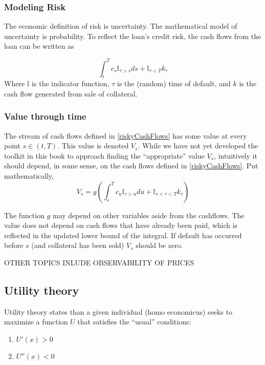 \documentclass{article}
\theoremstyle{definition}
\begin{document}
\subsubsection{Modeling Risk}
The economic definition of risk is uncertainty.  The mathematical model of uncertainty is probability.  To reflect the loan's credit risk, the cash flows from the loan can be written as 

\begin{equation} \label{riskyCashFlows} \int_t ^ T c_s \mathbb{I}_{\tau>s} ds+\mathbb{I}_{\tau<T} k_\tau \end{equation}
Where \(\mathbb{I}\) is the indicator function, \(\tau\) is the (random) time of default, and \(k\) is the cash flow generated from sale of collateral.  

\subsubsection{Value through time}

The stream of cash flows defined in \ref{riskyCashFlows} has some value at every point \(s \in (t, T)\).  This value is denoted \(V_s\).  While we have not yet developed the toolkit in this book to approach finding the ``appropriate'' value \(V_s\), intuitively it should depend, in some sense, on the cash flows defined in \ref{riskyCashFlows}.  Put mathematically, 
\[V_s=g\left(   \int_s ^ T c_u \mathbb{I}_{\tau>u} du+\mathbb{I}_{s<\tau<T} k_\tau  \right) \]

The function \(g\) may depend on other variables aside from the cashflows.  The value does not depend on cash flows that have already been paid, which is reflected in the updated lower bound of the integral.  If default has occurred before \(s\) (and collateral has been sold) \(V_s\) should be zero.



OTHER TOPICS INLUDE OBSERVABILITY OF PRICES

\subsection{Utility theory}
Utility theory states than a given individual (homo economicus) seeks to maximize a function \(U\) that satisfies the ``usual'' conditions:
\begin{enumerate}
\item \(U'(x)>0\)
\item \(U''(x)<0\)
\end{enumerate}
\end{document}
